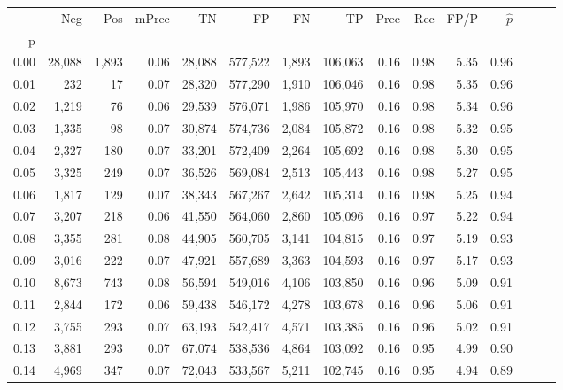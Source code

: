 \begin{tabular}{rrrrrrrrrrrrrrr}
\toprule
{} &     Neg &    Pos & mPrec &       TN &       FP &       FN &       TP &  Prec &   Rec &  FP/P & $\hat{p}$ \\
p    &         &        &       &          &          &          &          &       &       &       &           \\
\midrule
0.00 &  28,088 &  1,893 &  0.06 &   28,088 &  577,522 &    1,893 &  106,063 &  0.16 &  0.98 &  5.35 &      0.96 \\
0.01 &     232 &     17 &  0.07 &   28,320 &  577,290 &    1,910 &  106,046 &  0.16 &  0.98 &  5.35 &      0.96 \\
0.02 &   1,219 &     76 &  0.06 &   29,539 &  576,071 &    1,986 &  105,970 &  0.16 &  0.98 &  5.34 &      0.96 \\
0.03 &   1,335 &     98 &  0.07 &   30,874 &  574,736 &    2,084 &  105,872 &  0.16 &  0.98 &  5.32 &      0.95 \\
0.04 &   2,327 &    180 &  0.07 &   33,201 &  572,409 &    2,264 &  105,692 &  0.16 &  0.98 &  5.30 &      0.95 \\
0.05 &   3,325 &    249 &  0.07 &   36,526 &  569,084 &    2,513 &  105,443 &  0.16 &  0.98 &  5.27 &      0.95 \\
0.06 &   1,817 &    129 &  0.07 &   38,343 &  567,267 &    2,642 &  105,314 &  0.16 &  0.98 &  5.25 &      0.94 \\
0.07 &   3,207 &    218 &  0.06 &   41,550 &  564,060 &    2,860 &  105,096 &  0.16 &  0.97 &  5.22 &      0.94 \\
0.08 &   3,355 &    281 &  0.08 &   44,905 &  560,705 &    3,141 &  104,815 &  0.16 &  0.97 &  5.19 &      0.93 \\
0.09 &   3,016 &    222 &  0.07 &   47,921 &  557,689 &    3,363 &  104,593 &  0.16 &  0.97 &  5.17 &      0.93 \\
0.10 &   8,673 &    743 &  0.08 &   56,594 &  549,016 &    4,106 &  103,850 &  0.16 &  0.96 &  5.09 &      0.91 \\
0.11 &   2,844 &    172 &  0.06 &   59,438 &  546,172 &    4,278 &  103,678 &  0.16 &  0.96 &  5.06 &      0.91 \\
0.12 &   3,755 &    293 &  0.07 &   63,193 &  542,417 &    4,571 &  103,385 &  0.16 &  0.96 &  5.02 &      0.91 \\
0.13 &   3,881 &    293 &  0.07 &   67,074 &  538,536 &    4,864 &  103,092 &  0.16 &  0.95 &  4.99 &      0.90 \\
0.14 &   4,969 &    347 &  0.07 &   72,043 &  533,567 &    5,211 &  102,745 &  0.16 &  0.95 &  4.94 &      0.89 \\

\end{tabular}
